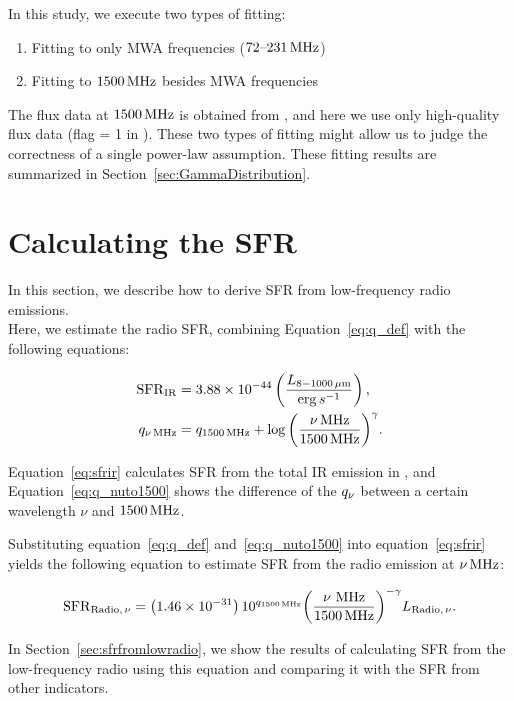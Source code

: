 In this study, we execute two types of fitting:

\begin{enumerate}
    \item Fitting to only MWA frequencies ($72\mbox{--}231\,\mathrm{MHz}$)
    \item Fitting to $1500\,\mathrm{MHz}$ besides MWA frequencies
\end{enumerate}

The flux data at $1500\,\mathrm{MHz}$ is obtained from \citet{Boselli2015}, and here we use only high-quality flux data (flag = 1 in \citealt{Boselli2015}).
These two types of fitting might allow us to judge the correctness of a single power-law assumption.
These fitting results are summarized in Section~\ref{sec:GammaDistribution}.



\section{Calculating the SFR}\label{sec:calculatingsfr}
In this section, we describe how to derive SFR from low-frequency radio emissions.\\
Here, we estimate the radio SFR, combining Equation~\ref{eq:q_def} with the following equations:

\begin{align}
    \mathrm{SFR}_{\mathrm{IR}} &= 3.88 \times 10^{-44}\left(\frac{L_{\mathrm{8-1000\,\mu m}}}{\mathrm{erg}\,s^{-1}}\right)\label{eq:sfrir},\\
    q_{\nu\,\mathrm{MHz}} &= q_{\mathrm{1500\,\mathrm{MHz}}} + \log{\left(\frac{\nu\,\mathrm{MHz}}{1500\,\mathrm{MHz}}\right)}^{\gamma}\label{eq:q_nuto1500}.
\end{align}

Equation~\ref{eq:sfrir} calculates SFR from the total IR emission in \citet{Murphy2011}, and Equation~\ref{eq:q_nuto1500} shows the difference of the $q_{\nu}$ between a certain wavelength $\nu$ and $1500\,\mathrm{MHz}$.

Substituting equation~\ref{eq:q_def} and~\ref{eq:q_nuto1500} into equation~\ref{eq:sfrir} yields the following equation to estimate SFR from the radio emission at $\nu\,\mathrm{MHz}$:

\begin{equation}\label{eq:sfrfromradio}
    \mathrm{SFR}_{\mathrm{Radio},\,\nu} = \left(1.46\times10^{-31}\right) 10^{q_{\mathrm{1500\,\mathrm{MHz}}}} {\left(\frac{\nu\,\,\mathrm{MHz}}{1500\,\mathrm{MHz}}\right)}^{-\gamma} L_{\mathrm{Radio},\,\nu}.
\end{equation}

In Section~\ref{sec:sfrfromlowradio}, we show the results of calculating SFR from the low-frequency radio using this equation and comparing it with the SFR from other indicators.



%
%

